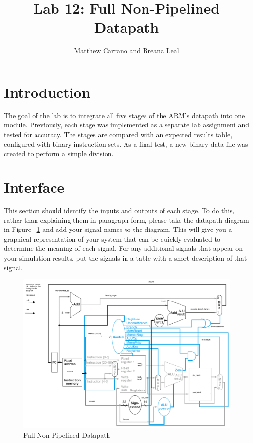 \documentclass{article}
\author{Matthew Carrano and Breana Leal}
\title{Lab 12: Full Non-Pipelined Datapath}
\begin{document}
\maketitle

\section{Introduction}
The goal of the lab is to integrate all five stages of the ARM's datapath into one module. Previously, each stage was implemented as a separate lab assignment and tested for accuracy. The stages are compared with an expected results table, configured with binary instruction sets. As a final test, a new binary data file was created to perform a simple division. 


\section{Interface}
This section should identify the inputs and outputs of each stage.  To do this, rather than explaining them in paragraph form, please take the datapath diagram in Figure ~\ref{fig:datapath} and add your signal names to the diagram.  This will give you a graphical representation of your system that can be quickly evaluated to determine the meaning of each signal.  For any additional signals that appear on your simulation results, put the signals in a table with a short description of that signal.

\begin{figure}
	\caption{Full Non-Pipelined Datapath}\label{fig:datapath}
	\begin{center}
		\includegraphics[width=\textwidth]{../images/Picture1.png}
	\end{center}
\end{figure}
\end{document}
